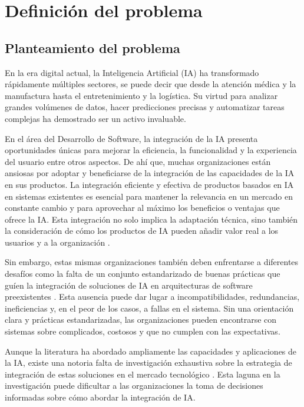 \section{Definición del problema}
\label{sec:problema}

\subsection{Planteamiento del problema}
En la era digital actual, la Inteligencia Artificial (IA) ha transformado rápidamente múltiples sectores, se puede decir que desde la atención médica y la manufactura hasta el entretenimiento y la logística. Su virtud para analizar grandes volúmenes de datos, hacer predicciones precisas y automatizar tareas complejas ha demostrado ser un activo invaluable. 

En el \'area del Desarrollo de Software, la integración de la IA presenta oportunidades únicas para mejorar la eficiencia, la funcionalidad y la experiencia del usuario entre otros aspectos. De ah\'i que, muchas organizaciones están ansiosas por adoptar y beneficiarse de la integraci\'on de las capacidades de la IA en sus productos. La integración eficiente y efectiva de productos basados en IA en sistemas existentes es esencial para mantener la relevancia en un mercado en constante cambio y para aprovechar al máximo los beneficios o ventajas que ofrece la IA. Esta integración no solo implica la adaptación técnica, sino también la consideración de cómo los productos de IA pueden añadir valor real a los usuarios y a la organización \citep{Cui2022ConstructionIntelligence}. 

Sin embargo, estas mismas organizaciones tambi\'en deben enfrentarse a diferentes desafíos como la falta de un conjunto estandarizado de buenas prácticas que gu\'ien la integraci\'on de soluciones de IA en arquitecturas de software preexistentes \citep{Wang2016ImplementingOutlook}. Esta ausencia puede dar lugar a incompatibilidades, redundancias, ineficiencias y, en el peor de los casos, a fallas en el sistema. Sin una orientación clara y prácticas estandarizadas, las organizaciones pueden encontrarse con sistemas sobre complicados, costosos y que no cumplen con las expectativas. 

Aunque la literatura ha abordado ampliamente las capacidades y aplicaciones de la IA, existe una notoria falta de investigación exhaustiva sobre la estrategia de integración de estas soluciones en el mercado tecnológico \citep{Cui2022ConstructionIntelligence}. Esta laguna en la investigación puede dificultar a las organizaciones la toma de decisiones informadas sobre cómo abordar la integración de IA.

